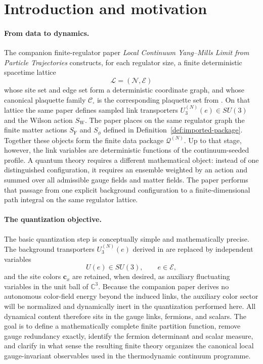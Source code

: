 \documentclass[11pt]{article}
\theoremstyle{remark}
\newcommand{\C}{\mathbb C}
\newcommand{\mcN}{\mathcal N}
\newcommand{\mcE}{\mathcal E}
\begin{document}
\tableofcontents

\section{Introduction and motivation}
\label{sec:introduction}

\paragraph{From data to dynamics.}
The companion finite-regulator paper \emph{Local Continuum Yang--Mills Limit
from Particle Trajectories} constructs, for each regulator size, a finite
deterministic spacetime lattice
\[
\mathcal L=(\mcN,\mcE)
\]
whose site set and edge set form a deterministic coordinate graph, and whose
canonical plaquette family $\mathcal C_\square$ is the corresponding
plaquette set from \cite{continuumqft}.  On that lattice the same paper defines
sampled link transporters $U_3^{(N)}(e)\in SU(3)$ and the Wilson action
$S_{\mathrm W}$.  The paper places on the same regulator graph the
finite matter actions $S_{\mathrm F}$ and $S_\phi$ defined in
Definition~\ref{def:imported-package}.  Together these objects form the finite
data package $\mathcal Q^{(N)}$.  Up to that stage, however,
the link variables are deterministic functions of the continuum-seeded profile.
A quantum theory requires a different mathematical object: instead of one
distinguished configuration, it requires an ensemble weighted by an action and
summed over all admissible gauge fields and matter fields.  The paper
performs that passage from one explicit background configuration to a
finite-dimensional path integral on the same regulator lattice.

\paragraph{The quantization objective.}
The basic quantization step is conceptually simple and mathematically precise.
The background transporters $U_3^{(N)}(e)$ derived in \cite{continuumqft} are replaced
by independent variables
\[
U(e)\in SU(3),\qquad e\in\mcE,
\]
and the site colors $\mathbf c_x$ are retained, when desired, as auxiliary
fluctuating variables in the unit ball of $\C^3$.  Because the companion paper
derives no autonomous color-field energy beyond the induced links, the
auxiliary color sector will be normalized and dynamically inert in the
quantization performed here.  All dynamical content therefore sits in the gauge
links, fermions, and scalars.  The goal is to define a mathematically complete
finite partition function, remove gauge redundancy exactly, identify the
fermion determinant and scalar measure, and clarify in what sense the resulting
finite theory organizes the canonical local gauge-invariant observables used in
the thermodynamic continuum programme.
\end{document}
